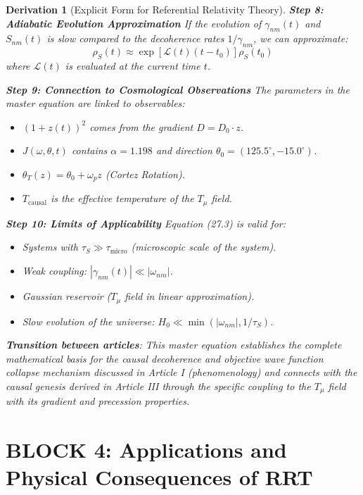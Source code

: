 \documentclass[10pt, a4paper]{article}
\newtheorem{derivation}{Derivation}
\begin{document}
\begin{derivation}[Explicit Form for Referential Relativity Theory]
\textbf{Step 8: Adiabatic Evolution Approximation}
If the evolution of $\gamma_{nm}(t)$ and $S_{nm}(t)$ is slow compared to the decoherence rates $1/\gamma_{nm}$, we can approximate:
\begin{equation}
\rho_S(t) \approx \exp\left[ \mathcal{L}(t) (t-t_0) \right] \rho_S(t_0)
\tag{27.6}
\end{equation}
where $\mathcal{L}(t)$ is evaluated at the current time $t$.

\textbf{Step 9: Connection to Cosmological Observations}
The parameters in the master equation are linked to observables:
\begin{itemize}
\item $(1+z(t))^2$ comes from the gradient $D = D_0 \cdot z$.
\item $J(\omega,\theta,t)$ contains $\alpha=1.198$ and direction $\theta_0=(125.5^\circ,-15.0^\circ)$.
\item $\theta_T(z) = \theta_0 + \omega_p z$ (Cortez Rotation).
\item $T_{\text{causal}}$ is the effective temperature of the $T_\mu$ field.
\end{itemize}

\textbf{Step 10: Limits of Applicability}
Equation (27.3) is valid for:
\begin{itemize}
\item Systems with $\tau_S \gg \tau_{\text{micro}}$ (microscopic scale of the system).
\item Weak coupling: $|\gamma_{nm}(t)| \ll |\omega_{nm}|$.
\item Gaussian reservoir ($T_\mu$ field in linear approximation).
\item Slow evolution of the universe: $H_0 \ll \min(|\omega_{nm}|, 1/\tau_S)$.
\end{itemize}

\textbf{Transition between articles}: This master equation establishes the complete mathematical basis for the causal decoherence and objective wave function collapse mechanism discussed in Article I (phenomenology) and connects with the causal genesis derived in Article III through the specific coupling to the $T_\mu$ field with its gradient and precession properties.
\end{derivation}


\section*{BLOCK 4: Applications and Physical Consequences of RRT}
\end{document}
